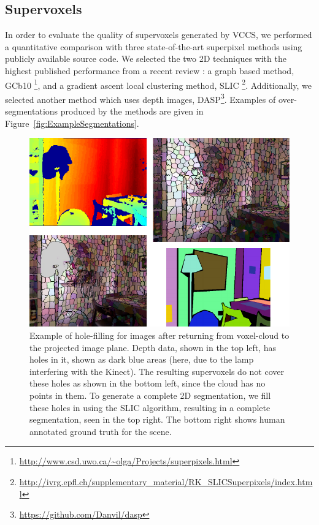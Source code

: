\subsection {Supervoxels}
\label{sec:Evaluation}
In order to evaluate the quality of supervoxels generated by VCCS, we performed a quantitative comparison with three state-of-the-art superpixel methods using publicly available source code. 
We selected the two 2D techniques with the highest published performance from a recent review \cite{SLICCompared}: a graph based method, GCb10 \cite{SuperpixelsSupervoxels}\footnote{\url{http://www.csd.uwo.ca/~olga/Projects/superpixels.html}}, and a gradient ascent local clustering method, SLIC \cite{SLICCompared}\footnote{\url{http://ivrg.epfl.ch/supplementary_material/RK_SLICSuperpixels/index.html}}.
Additionally, we selected another method which uses depth images, DASP\cite{DASP}\footnote{\url{https://github.com/Danvil/dasp}}.
Examples of over-segmentations produced by the methods are given in Figure~\ref{fig:ExampleSegmentations}.
\begin{figure}[t]
\begin{center}
\includegraphics[width=0.9\linewidth]{figures/CVPR2013/BackTo2D.pdf}
\end{center}
   \caption[2D Hole Filling]{Example of hole-filling for images after returning from voxel-cloud to the projected image plane. Depth data, shown in the top left, has holes in it, shown as dark blue areas (here, due to the lamp interfering with the Kinect). The resulting supervoxels do not cover these holes as shown in the bottom left, since the cloud has no points in them. To generate a complete 2D segmentation, we fill these holes in using the SLIC algorithm, resulting in a complete segmentation, seen in the top right. The bottom right shows human annotated ground truth for the scene. }
\label{fig:ReturnToPlane}
\end{figure}

